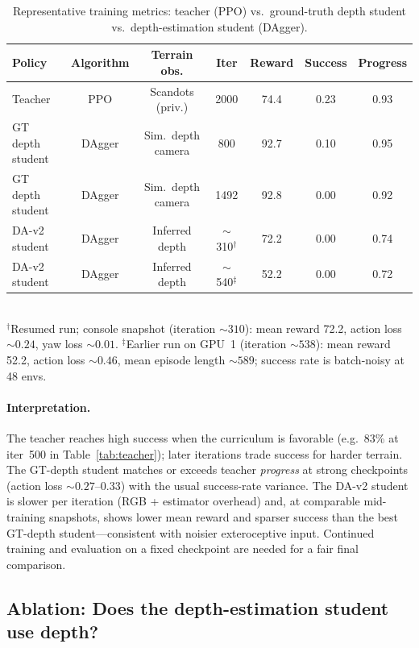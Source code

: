 \documentclass[11pt,a4paper]{article}
\begin{document}
\begin{table}[ht]
\centering
\caption{Representative training metrics: teacher (PPO) vs.\ ground-truth depth
student vs.\ depth-estimation student (DAgger).}
\label{tab:threepolicies}
\small
\begin{tabular}{lcccccc}
\toprule
\textbf{Policy} & \textbf{Algorithm} & \textbf{Terrain obs.} & \textbf{Iter} &
\textbf{Reward} & \textbf{Success} & \textbf{Progress} \\
\midrule
Teacher & PPO & Scandots (priv.) & 2000 & 74.4 & 0.23 & 0.93 \\
GT depth student & DAgger & Sim.\ depth camera & 800 & 92.7 & 0.10 & 0.95 \\
GT depth student & DAgger & Sim.\ depth camera & 1492 & 92.8 & 0.00 & 0.92 \\
DA-v2 student & DAgger & Inferred depth & $\sim$310$^{\dagger}$ & 72.2 & 0.00 & 0.74 \\
DA-v2 student & DAgger & Inferred depth & $\sim$540$^{\ddagger}$ & 52.2 & 0.00 & 0.72 \\
\bottomrule
\end{tabular}
\\[4pt]
\footnotesize
$^{\dagger}$Resumed run; console snapshot (iteration ${\sim}310$): mean reward
72.2, action loss ${\sim}0.24$, yaw loss ${\sim}0.01$.\quad
$^{\ddagger}$Earlier run on GPU~1 (iteration ${\sim}538$): mean reward 52.2,
action loss ${\sim}0.46$, mean episode length ${\sim}589$; success rate is
batch-noisy at 48 envs.
\end{table}

\paragraph{Interpretation.}
The teacher reaches high success when the curriculum is favorable (e.g.\ 83\% at
iter~500 in Table~\ref{tab:teacher}); later iterations trade success for harder
terrain. The GT-depth student matches or exceeds teacher \emph{progress} at
strong checkpoints (action loss ${\sim}0.27$--0.33) with the usual success-rate
variance. The DA-v2 student is slower per iteration (RGB + estimator overhead)
and, at comparable mid-training snapshots, shows lower mean reward and sparser
success than the best GT-depth student---consistent with noisier exteroceptive
input. Continued training and evaluation on a fixed checkpoint are needed for a
fair final comparison.

\subsection{Ablation: Does the depth-estimation student use depth?}
\label{sec:ablation}
\end{document}
